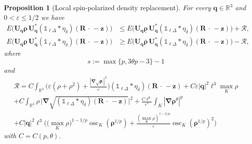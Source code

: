 \documentclass[final,reqno]{amsart}
\newtheorem{proposition}[theorem]{Proposition}
\theoremstyle{remark}
\renewcommand{\le}{\leqslant}
\renewcommand{\ge}{\geqslant}
\renewcommand{\epsilon}{\varepsilon}
\newcommand{\ol}[1]{\overline{#1}}
\newcommand{\ul}[1]{\underline{#1}}
\newcommand{\RR}{\mathbb{R}}
\newcommand{\iden}{\mathbb{1}}
\newcommand{\grad}{\bm{\nabla}}
\newcommand{\tetra}{\mathbb{\Delta}}
\begin{document}
\begin{proposition}[Local spin-polarized density replacement]
For every $\mathbf{q}\in\RR^3$ and $0<\epsilon\le1/2$ we have
\begin{align}
E\big(\mathbf{U}_{\mathbf{q}}\bm{\rho}\,\mathbf{U}_{\mathbf{q}}^*(\iden_{\ell\tetra}\ast\eta_\delta)(\mathbf{R}\,\cdot\,-\mathbf{z})\big)&\le E\big(\mathbf{U}_{\mathbf{q}}\ul{\bm{\rho}}\,\mathbf{U}_{\mathbf{q}}^*(\iden_{\ell\tetra}\ast\eta_\delta)(\mathbf{R}\,\cdot\,-\mathbf{z})\big)+\mathcal{R},\label{eq:replace_spiral_upper}\\
E\big(\mathbf{U}_{\mathbf{q}}\bm{\rho}\,\mathbf{U}_{\mathbf{q}}^*(\iden_{\ell\tetra}\ast\eta_\delta)(\mathbf{R}\,\cdot\,-\mathbf{z})\big)&\ge E\big(\mathbf{U}_{\mathbf{q}}\ol{\bm{\rho}}\,\mathbf{U}_{\mathbf{q}}^*(\iden_{\ell\tetra}\ast\eta_\delta)(\mathbf{R}\,\cdot\,-\mathbf{z})\big)-\mathcal{R},\label{eq:replace_spiral_lower}
\end{align}
where
\begin{equation}\label{eq:def_s}
s:=\max\{p,3\theta p-3\}-1
\end{equation}
and
\begin{multline}\label{eq:spiral_rotation_error}
\mathcal{R}=C\int_{\RR^3}\Big(\epsilon(\rho+\rho^2)+\frac{|\grad\sqrt{\bm{\rho}}|^2}{\epsilon}\Big)(\iden_{\ell\tetra}\ast\eta_\delta)(\mathbf{R}\,\cdot\,-\mathbf{z})+C\epsilon|\mathbf{q}|^2\ell^3\max_K\rho\\
+C\int_{\RR^3}\rho\,\Big|\grad\sqrt{(\iden_{\ell\tetra}\ast\eta_\delta)(\mathbf{R}\,\cdot\,-\mathbf{z})}\Big|^2+\frac{C\ell^p}{\epsilon^s}\int_K|\grad\bm{\rho}^\theta|^p\\
+C|\mathbf{q}|^2\ell^3\bigg(\Big(\max_K\rho\Big)^{1-1/p}\operatorname{osc}_K(\bm{\rho}^{1/p})+\frac{(\max_K\rho)^{1-2/p}}{\epsilon}\operatorname{osc}_K(\bm{\rho}^{1/p})^2\bigg)
\end{multline}
with $C=C(p,\theta)$.
\end{proposition}
\end{document}
